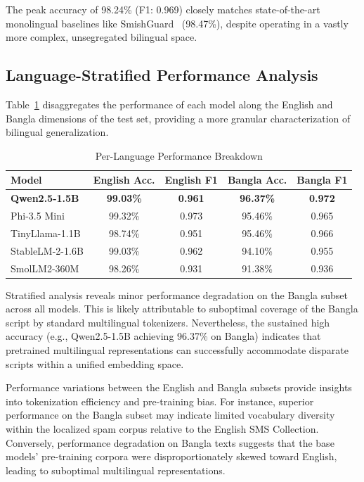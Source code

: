\documentclass[journal]{IEEEtran}
\begin{document}
The peak accuracy of 98.24\% (F1: 0.969) closely matches state-of-the-art monolingual baselines like SmishGuard~\cite{ref6} (98.47\%), despite operating in a vastly more complex, unsegregated bilingual space.

\subsection{Language-Stratified Performance Analysis}

Table~\ref{tab:lang_results} disaggregates the performance of each model along the English
and Bangla dimensions of the test set, providing a more granular
characterization of bilingual generalization.

\begin{table}[htbp]
\caption{Per-Language Performance Breakdown}
\label{tab:lang_results}
\centering
\begin{tabular}{lcccc}
\toprule
\textbf{Model} & \textbf{English Acc.} & \textbf{English F1} & \textbf{Bangla Acc.} & \textbf{Bangla F1} \\
\midrule
\rowcolor{gray!20} \textbf{Qwen2.5-1.5B} & \textbf{99.03\%} & \textbf{0.961} & \textbf{96.37\%} & \textbf{0.972} \\
Phi-3.5 Mini & 99.32\% & 0.973 & 95.46\% & 0.965 \\
TinyLlama-1.1B & 98.74\% & 0.951 & 95.46\% & 0.966 \\
StableLM-2-1.6B & 99.03\% & 0.962 & 94.10\% & 0.955 \\
SmolLM2-360M & 98.26\% & 0.931 & 91.38\% & 0.936 \\
\bottomrule
\end{tabular}
\end{table}



Stratified analysis reveals minor performance degradation on the Bangla subset across all models. This is likely attributable to suboptimal coverage of the Bangla script by standard multilingual tokenizers. Nevertheless, the sustained high accuracy (e.g., Qwen2.5-1.5B achieving 96.37\% on Bangla) indicates that pretrained multilingual representations can successfully accommodate disparate scripts within a unified embedding space.

Performance variations between the English and Bangla subsets provide insights into tokenization efficiency and pre-training bias. For instance, superior performance on the Bangla subset may indicate limited vocabulary diversity within the localized spam corpus relative to the English SMS Collection. Conversely, performance degradation on Bangla texts suggests that the base models' pre-training corpora were disproportionately skewed toward English, leading to suboptimal multilingual representations.
\end{document}
